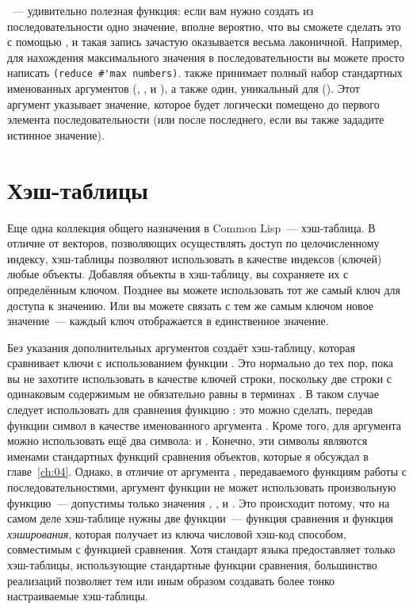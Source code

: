 ~--- удивительно полезная функция: если вам нужно создать из
последовательности одно значение, вполне вероятно, что вы сможете сделать это с помощью
, и такая запись зачастую оказывается весьма лаконичной.
Например, для нахождения максимального значения в последовательности вы можете просто
написать \lstinline!(reduce #'max numbers)!.  также принимает полный набор
стандартных именованных аргументов (, ,  и
), а также один, уникальный для  ().  Этот
аргумент указывает значение, которое будет логически помещено до первого элемента
последовательности (или после последнего, если вы также зададите  истинное
значение).

\section{Хэш-таблицы}

Еще одна коллекция общего назначения в Common Lisp~--- хэш-таблица.  В отличие от векторов,
позволяющих осуществлять доступ по целочисленному индексу,
хэш-таблицы позволяют использовать в качестве индексов (ключей) любые объекты.
Добавляя объекты в хэш-таблицу, вы сохраняете их с определённым ключом.  Позднее вы
можете использовать тот же самый ключ для доступа к значению.  Или вы можете связать
с тем же самым ключом новое значение~--- каждый ключ отображается в единственное значение.

Без указания дополнительных аргументов  создаёт хэш-таблицу, которая
сравнивает ключи с использованием функции .  Это нормально до тех пор, пока вы
не захотите использовать в качестве ключей строки, поскольку две строки с одинаковым
содержимым не обязательно равны в терминах .  В таком случае следует
использовать для сравнения функцию : это можно сделать, передав функции
 символ  в качестве именованного аргумента .
Кроме того, для аргумента  можно использовать ещё два символа:  и
.  Конечно, эти символы являются именами стандартных функций сравнения
объектов, которые я обсуждал в главе~\ref{ch:04}.  Однако, в отличие от аргумента ,
передаваемого функциям работы с последовательностями, аргумент  функции
 не может использовать произвольную функцию~--- допустимы только
значения , ,  и .  Это происходит потому, что
на самом деле хэш-таблице нужны две функции~--- функция сравнения и функция
\textit{хэширования}, которая получает из ключа числовой хэш-код способом, совместимым с
функцией сравнения.  Хотя стандарт языка предоставляет
только хэш-таблицы, использующие стандартные функции сравнения, большинство
реализаций позволяет тем или иным образом создавать более тонко настраиваемые
хэш-таблицы.

